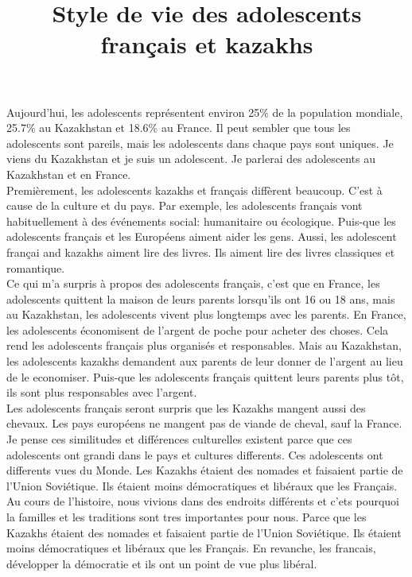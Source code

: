 \documentclass[a4paper, 12pt]{article}
\title{Style de vie des adolescents français et kazakhs}
\author{}
\date{}
\begin{document}
\maketitle
{}

Aujourd'hui, les adolescents représentent environ 25\% \cite{teenagers} de la population mondiale, 25.7\% au Kazakhstan et 18.6\% au France. Il peut sembler que tous les adolescents sont pareils, mais les adolescents dans chaque pays sont uniques. Je viens du Kazakhstan et je suis un adolescent. Je parlerai des adolescents au Kazakhstan et en France. \\

Premièrement, les adolescents kazakhs et français diffèrent beaucoup.
C'est à cause de la culture et du pays.
Par exemple, les adolescents français vont habituellement à des événements social: humanitaire ou écologique.
Puis-que les adolescents français et les Européens aiment aider les gens.
Aussi, les adolescent françai and kazakhs aiment lire des livres. \cite{hobbies}
Ils aiment lire des livres classiques et romantique.\\

Ce qui m'a surpris à propos des adolescents français, c'est que en France, les adolescents quittent la maison de leurs parents lorsqu'ils ont 16 ou 18 ans, mais au Kazakhstan, les adolescents vivent plus longtemps avec les parents.
En France, les adolescents économisent de l'argent de poche pour acheter des choses.
Cela rend les adolescents français plus organisés et responsables.
Mais au Kazakhstan, les adolescents kazakhs demandent aux parents de leur donner de l'argent au lieu de le economiser.
Puis-que les adolescents français quittent leurs parents plus tôt, ils sont plus responsables avec l'argent.\\

Les adolescents français seront surpris que les Kazakhs mangent aussi des chevaux. \cite{horse} Les pays européens ne mangent pas de viande de cheval, sauf la France. \cite{france}\\

Je pense ces similitudes et différences culturelles existent parce que ces adolescents ont grandi dans le pays et cultures differents.
Ces adolescents ont differents vues du Monde.
Les Kazakhs étaient des nomades et faisaient partie de l'Union Soviétique.
Ils étaient moins démocratiques et libéraux que les Français.
Au cours de l'histoire, nous vivions dans des endroits différents et c'ets pourquoi la familles et les traditions sont tres importantes pour nous.
Parce que les Kazakhs étaient des nomades et faisaient partie de l'Union Soviétique.
Ils étaient moins démocratiques et libéraux que les Français.
En revanche, les francais, développer la démocratie et ils ont un point de vue plus libéral.\\
\end{document}
